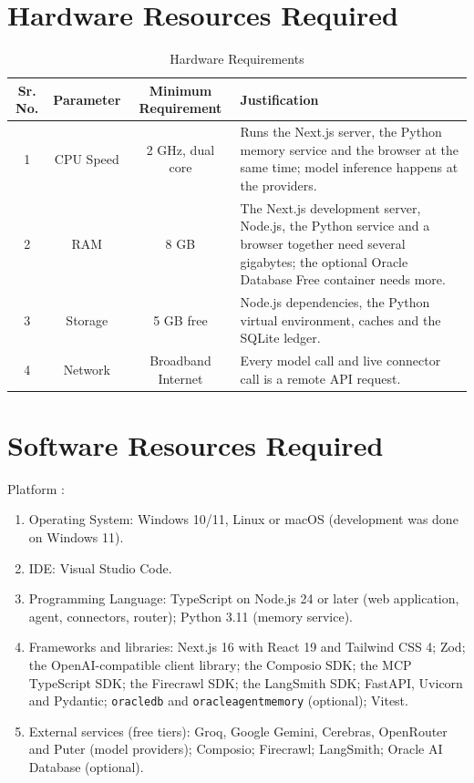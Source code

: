 \documentclass[oneside,a4paper,12pt]{report}
\begin{document}
\section{Hardware Resources Required}
\begin{table}[!htbp]
\begin{center}
\def\arraystretch{1.5}
  \begin{tabular}{| c | c | c | p{6cm} |}
\hline
Sr. No. &	Parameter &	Minimum Requirement & Justification \\
\hline
1 &	CPU Speed &	 2 GHz, dual core  & Runs the Next.js server, the Python memory service and the browser at the same time; model inference happens at the providers. \\
\hline
2 &	RAM  &	8 GB &  The Next.js development server, Node.js, the Python service and a browser together need several gigabytes; the optional Oracle Database Free container needs more. \\
 \hline
3 & Storage & 5 GB free & Node.js dependencies, the Python virtual environment, caches and the SQLite ledger. \\
\hline
4 & Network & Broadband Internet & Every model call and live connector call is a remote API request. \\
\hline
\end{tabular}
 \caption { Hardware Requirements }
 \label{tab:hreq}
\end{center}

\end{table}


\section{Software Resources Required}
Platform :
\begin{enumerate}
\item Operating System: Windows 10/11, Linux or macOS (development was done on Windows 11).
\item IDE: Visual Studio Code.
\item Programming Language: TypeScript on Node.js 24 or later (web application, agent, connectors, router); Python 3.11 (memory service).
\item Frameworks and libraries: Next.js 16 with React 19 and Tailwind CSS 4; Zod; the OpenAI-compatible client library; the Composio SDK; the MCP TypeScript SDK; the Firecrawl SDK; the LangSmith SDK; FastAPI, Uvicorn and Pydantic; \texttt{oracledb} and \texttt{oracleagentmemory} (optional); Vitest.
\item External services (free tiers): Groq, Google Gemini, Cerebras, OpenRouter and Puter (model providers); Composio; Firecrawl; LangSmith; Oracle AI Database (optional).
\end{enumerate}
\end{document}
